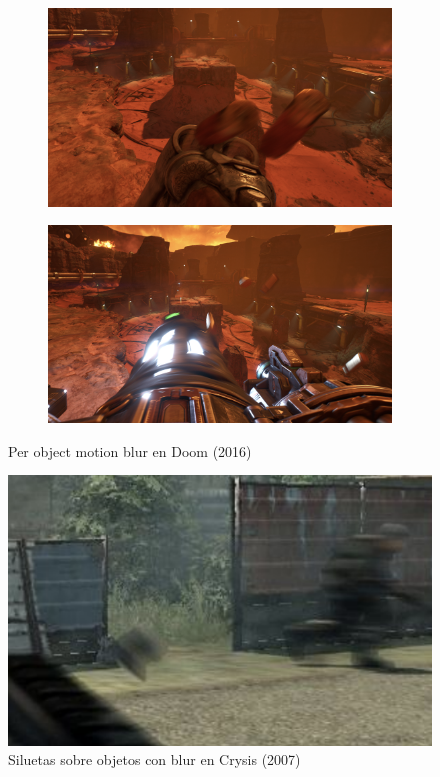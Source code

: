 \documentclass[withindex, glossary]{cam-thesis}
\begin{document}
\begin{figure}[!htbp]
    \centering
    \begin{subfigure}[b]{0.8\textwidth}
        \includegraphics[width=\textwidth]{figures/doomblur1.png}
    \end{subfigure}
    \centering
    \begin{subfigure}[b]{0.8\textwidth}
        \includegraphics[width=\textwidth]{figures/doomblur2.png}
    \end{subfigure}
    \caption{Per object motion blur en Doom (2016)\label{doomblur}}
\end{figure}

\begin{figure}[!htbp]
    \includegraphics[width=.8\linewidth]{figures/crysisblur.png}
    \caption{Siluetas sobre objetos con blur en Crysis (2007)\cite{crysis}\label{crysisblur}}
\end{figure}
\end{document}
